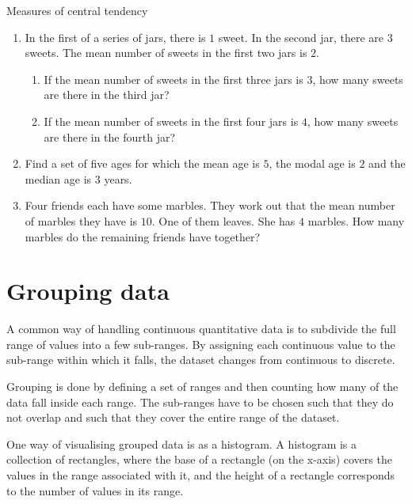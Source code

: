 \begin{exercises}{Measures of central tendency}
\begin{enumerate}[noitemsep, label=\textbf{\arabic*}.]

\item In the first of a series of jars, there is $1$ sweet. In the
  second jar, there are $3$ sweets. The mean number of sweets in the
  first two jars is $2$.
  \begin{enumerate}
  \item If the mean number of sweets in the first three jars is $3$, how
    many sweets are there in the third jar?
  \item If the mean number of sweets in the first four jars is $4$, how
    many sweets are there in the fourth jar?
  \end{enumerate}

\item Find a set of five ages for which the mean age is $5$, the modal
  age is $2$ and the median age is $3$ years.

\item Four friends each have some marbles. They work out that the mean
  number of marbles they have is $10$. One of them leaves. She has $4$
  marbles. How many marbles do the remaining friends have together?

\end{enumerate}
\end{exercises}

\section{Grouping data}
\label{sec:statistics_grouping_data}
A common way of handling continuous quantitative data is to subdivide
the full range of values into a few sub-ranges.
By assigning each continuous value to the sub-range within which it
falls, the dataset changes from continuous to discrete.

Grouping is done by defining a set of ranges and then counting how
many of the data fall inside each range. The sub-ranges have to be chosen
such that they do not overlap and such that they cover the entire
range of the dataset.

One way of visualising grouped data is as a histogram. A histogram is
a collection of rectangles, where the base of a rectangle (on the
x-axis) covers the values in the range associated with it, and the
height of a rectangle corresponds to the number of values in its
range.

